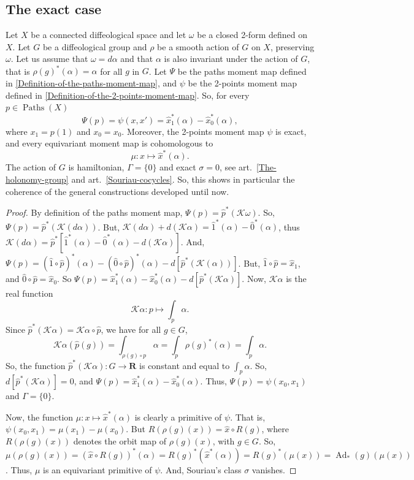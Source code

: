 \documentclass[10pt,reqno,twoside]{amsart}
\newcommand{\RR}{\mathbf{R}}
\newcommand{\cK}{\mathcal{K}}
\DeclareMathOperator{\Ad}{Ad}
\DeclareMathOperator{\Paths}{Paths}
\newcommand{\but}{\hat{1}}
\newcommand{\source}{\hat{0}}
\newcommand{\R}{R}
\theoremstyle{plain}
\theoremstyle{definition}
\newcommand{\article}[1]{\subsection{#1}}
\begin{document}
  \article{The exact case}
  \label{The-exact-case}
  Let $X$ be a connected diffeological space and let $\omega$ be a closed 2-form defined on $X$.
  Let $G$ be a diffeological group and $\rho$ be a smooth action of $G$ on $X$,
  preserving $\omega$.
  Let us assume that $\omega = d\alpha$ and that $\alpha$ is also invariant under the action of $G$,
  that is $\rho(g)^*(\alpha) = \alpha$ for all $g$ in $G$.
  Let $\Psi$ be the paths moment map defined in \ref{Definition-of-the-paths-moment-map},
  and $\psi$ be the 2-points moment map defined in \ref{Definition-of-the-2-points-moment-map}.
  So,
  for every $p \in \Paths(X)$
  $$
    \Psi(p) = \psi(x,x') = \hat x_1^*(\alpha) - \hat x_0^*(\alpha),
    $$
  where $x_1 = p(1)$ and $x_0 = x_0$.
  Moreover,
  the 2-points moment map $\psi$ is exact,
  and every equivariant moment map is cohomologous to
  $$
    \mu : x \mapsto \hat x^*(\alpha).
    $$
  The action of $G$ is hamiltonian,
  $\Gamma = \{0\}$ and exact $\sigma = 0$,
  see art.~\ref{The-holonomy-group} and art.~\ref{Souriau-cocycles}.
  So,
  this shows in particular the coherence of the general constructions developed until now.
  
  \begin{proof}
    By definition of the paths moment map,
    $\Psi(p) = \hat p^*(\cK \omega)$.
    So,
    $\Psi(p) = \hat p^*(\cK(d\alpha))$.
    But,
    $\cK(d\alpha) + d(\cK \alpha) = \but^*(\alpha) - \source^*(\alpha)$,
    thus $\cK(d\alpha) = \hat p^*[\but^*(\alpha) - \source^*(\alpha) - d(\cK\alpha)]$.
    And,
    $\Psi(p) = (\but \circ \hat p)^*(\alpha) - (\source \circ \hat p)^*(\alpha) - d[\hat p^* (\cK(\alpha))]$.
    But,
    $\but \circ \hat p = \hat x_1$,
    and $\source \circ \hat p = \hat x_0$.
    So $\Psi(p) = \hat x_1^*(\alpha)-\hat x_0^*(\alpha) -d[\hat p^*(\cK\alpha)]$.
    Now,
    $\cK\alpha$ is the real function
    $$
      \cK \alpha : p \mapsto \int_p \alpha.
      $$
    Since $\hat p^*(\cK\alpha) = \cK\alpha \circ \hat p$,
    we have for all $g \in G$,
    $$
      \cK\alpha(\hat p(g)) = \int_{\rho(g) \circ p} \alpha
      = \int_p \rho(g)^*(\alpha) = \int_p \alpha.
      $$
    So,
    the function $\hat p^*(\cK\alpha): G \to \RR$ is constant and equal to $\int_p \alpha$.
    So,
    $d [\hat p^*(\cK\alpha)] = 0$,
    and $\Psi(p) = \hat x_1^*(\alpha) - \hat x_0^*(\alpha)$.
    Thus,
    $\Psi(p) = \psi(x_0,x_1)$ and $\Gamma = \{0\}$.
    
    Now,
    the function $\mu: x \mapsto \hat x^*(\alpha)$ is clearly a primitive of $\psi$.
    That is,
    $\psi(x_0,x_1) = \mu(x_1) - \mu(x_0)$.
    But $\R(\rho(g)(x)) = \hat x \circ \R(g)$,
    where $\R(\rho(g)(x))$ denotes the orbit map of $\rho(g)(x)$,
    with $g \in G$.
    So,
    $\mu(\rho(g)(x)) = (\hat x \circ \R(g))^*(\alpha) = \R(g)^*(\hat x^*(\alpha)) = \R(g)^*(\mu(x)) = \Ad_*(g)(\mu(x))$.
    Thus,
    $\mu$ is an equivariant primitive of $\psi$.
    And,
    Souriau's class $\sigma$ vanishes.
  \end{proof}
  
\end{document}
